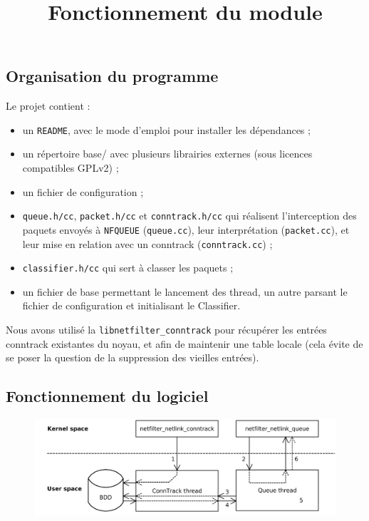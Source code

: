 \subsection{Organisation du programme}
Le projet contient :
\begin{itemize}
\item un \verb+README+, avec le mode d'emploi pour installer les dépendances ;
\item un répertoire base/ avec plusieurs librairies externes (sous
licences compatibles GPLv2) ;
\item un fichier de configuration ;
\item \verb+queue.h/cc+, \verb+packet.h/cc+ et \verb+conntrack.h/cc+ qui réalisent l'interception des paquets envoyés à \verb+NFQUEUE+ (\verb+queue.cc+), leur
interprétation (\verb+packet.cc+), et leur mise en relation avec un conntrack
(\verb+conntrack.cc+) ;
\item \verb+classifier.h/cc+ qui sert à classer les paquets ;
\item un fichier de base permettant le lancement des thread, un autre parsant le fichier de configuration et initialisant le Classifier.
\end{itemize}

Nous avons utilisé la \verb+libnetfilter_conntrack+ pour
récupérer les entrées conntrack existantes du noyau, et afin de maintenir une table locale (cela évite de se poser la question de
la suppression des vieilles entrées).

\subsection{Fonctionnement du logiciel}

\begin{figure}[h]
\centering
\includegraphics[width=\textwidth]{schema2.png}\\
\title{Fonctionnement du module}
\end{figure}

